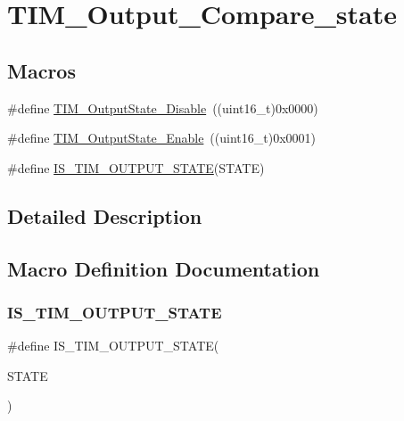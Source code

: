 \hypertarget{group___t_i_m___output___compare__state}{}\section{T\+I\+M\+\_\+\+Output\+\_\+\+Compare\+\_\+state}
\label{group___t_i_m___output___compare__state}
\subsection*{Macros}
\begin{DoxyCompactItemize}
\item 
\#define \mbox{\hyperlink{group___t_i_m___output___compare__state_ga4ad0f484cfa16b5190654da8278940d0}{T\+I\+M\+\_\+\+Output\+State\+\_\+\+Disable}}~((uint16\+\_\+t)0x0000)
\item 
\#define \mbox{\hyperlink{group___t_i_m___output___compare__state_ga65afdda8761b6ac5ed0c0ad67c05dffe}{T\+I\+M\+\_\+\+Output\+State\+\_\+\+Enable}}~((uint16\+\_\+t)0x0001)
\item 
\#define \mbox{\hyperlink{group___t_i_m___output___compare__state_ga5848617f830d2de688eaff50ed279679}{I\+S\+\_\+\+T\+I\+M\+\_\+\+O\+U\+T\+P\+U\+T\+\_\+\+S\+T\+A\+TE}}(S\+T\+A\+TE)
\end{DoxyCompactItemize}


\subsection{Detailed Description}


\subsection{Macro Definition Documentation}
\mbox{\label{group___t_i_m___output___compare__state_ga5848617f830d2de688eaff50ed279679}} 
\subsubsection{\texorpdfstring{IS\_TIM\_OUTPUT\_STATE}{IS\_TIM\_OUTPUT\_STATE}}
{\footnotesize\ttfamily \#define I\+S\+\_\+\+T\+I\+M\+\_\+\+O\+U\+T\+P\+U\+T\+\_\+\+S\+T\+A\+TE(\begin{DoxyParamCaption}\item[{}]{S\+T\+A\+TE }\end{DoxyParamCaption})}

